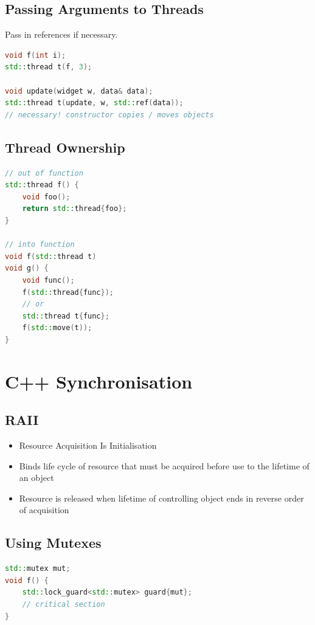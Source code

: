 \documentclass{article}
\begin{document}
\subsection{Passing Arguments to Threads}
Pass in references if necessary.
\begin{lstlisting}[language=C++]
void f(int i);
std::thread t(f, 3);

void update(widget w, data& data);
std::thread t(update, w, std::ref(data));
// necessary! constructor copies / moves objects
\end{lstlisting}

\subsection{Thread Ownership}
\begin{lstlisting}[language=C++]
// out of function
std::thread f() {
    void foo();
    return std::thread{foo};
}

// into function
void f(std::thread t)
void g() {
    void func();
    f(std::thread{func});
    // or
    std::thread t{func};
    f(std::move(t));
}

\end{lstlisting}

\section{C++ Synchronisation}

\subsection{RAII}
\begin{itemize}
    \item Resource Acquisition Is Initialisation
    \item Binds life cycle of resource that must be acquired before use to the lifetime of an object
    \item Resource is released when lifetime of controlling object ends in reverse order of acquisition
\end{itemize}

\subsection{Using Mutexes}
\begin{lstlisting}[language=C++]
std::mutex mut;
void f() {
    std::lock_guard<std::mutex> guard{mut};
    // critical section
}
\end{lstlisting}
\end{document}
